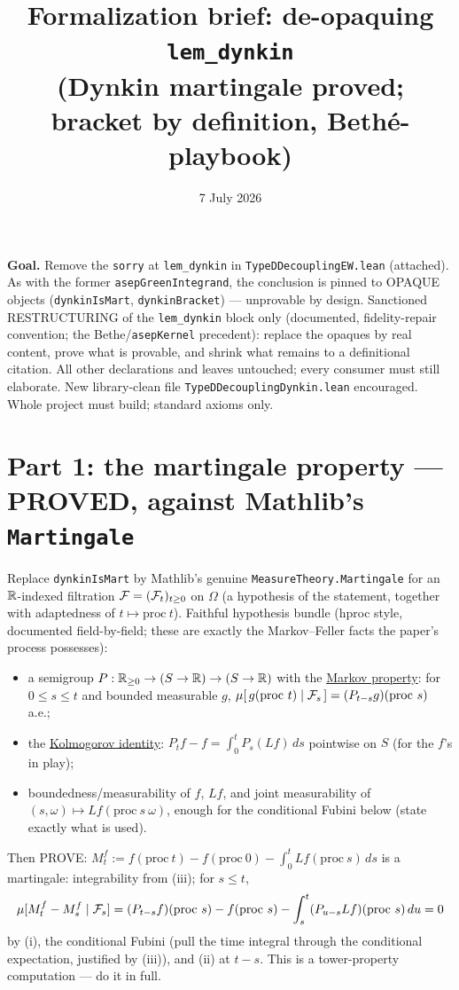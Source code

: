 \documentclass[11pt]{article}
\title{Formalization brief: de-opaquing \texttt{lem\_dynkin}\\
(Dynkin martingale proved; bracket by definition, Beth\'e-playbook)}
\date{7 July 2026}
\theoremstyle{plain}
\theoremstyle{remark}
\begin{document}
\maketitle

\noindent\textbf{Goal.} Remove the \texttt{sorry} at \texttt{lem\_dynkin} in
\texttt{TypeDDecouplingEW.lean} (attached). As with the former
\texttt{asepGreenIntegrand}, the conclusion is pinned to OPAQUE objects
(\texttt{dynkinIsMart}, \texttt{dynkinBracket}) --- unprovable by design.
Sanctioned RESTRUCTURING of the \texttt{lem\_dynkin} block only (documented,
fidelity-repair convention; the Bethe/\texttt{asepKernel} precedent): replace
the opaques by real content, prove what is provable, and shrink what remains
to a definitional citation. All other declarations and leaves untouched;
every consumer must still elaborate. New library-clean file
\texttt{TypeDDecouplingDynkin.lean} encouraged. Whole project must build;
standard axioms only.

\section*{Part 1: the martingale property --- PROVED, against Mathlib's
\texttt{Martingale}}

Replace \texttt{dynkinIsMart} by Mathlib's genuine
\texttt{MeasureTheory.Martingale} for an $\mathbb{R}$-indexed filtration
$\mathcal F=(\mathcal F_t)_{t\ge0}$ on $\Omega$ (a hypothesis of the statement, together with
adaptedness of $t\mapsto\mathrm{proc}\ t$). Faithful hypothesis bundle
(hproc style, documented field-by-field; these are exactly the Markov--Feller
facts the paper's process possesses):
\begin{itemize}
\item[(i)] a semigroup $P:\mathbb{R}_{\ge0}\to(S\to\mathbb{R})\to(S\to\mathbb{R})$ with the
\underline{Markov property}: for $0\le s\le t$ and bounded measurable $g$,
$\mu[\,g(\mathrm{proc}\ t)\mid\F_s\,]=(P_{t-s}g)(\mathrm{proc}\ s)$ a.e.;
\item[(ii)] the \underline{Kolmogorov identity}:
$P_tf-f=\int_0^tP_s(Lf)\,ds$ pointwise on $S$ (for the $f$'s in play);
\item[(iii)] boundedness/measurability of $f$, $Lf$, and joint measurability
of $(s,\omega)\mapsto Lf(\mathrm{proc}\ s\ \omega)$, enough for the
conditional Fubini below (state exactly what is used).
\end{itemize}
Then PROVE: $M^f_t:=f(\mathrm{proc}\ t)-f(\mathrm{proc}\ 0)
-\int_0^tLf(\mathrm{proc}\ s)\,ds$ is a martingale:
integrability from (iii); for $s\le t$,
\[
  \mu[M^f_t-M^f_s\mid\mathcal F_s]
  =(P_{t-s}f)(\mathrm{proc}\ s)-f(\mathrm{proc}\ s)
  -\int_s^t(P_{u-s}Lf)(\mathrm{proc}\ s)\,du=0
\]
by (i), the conditional Fubini (pull the time integral through the
conditional expectation, justified by (iii)), and (ii) at $t-s$. This is a
tower-property computation --- do it in full.
\end{document}
